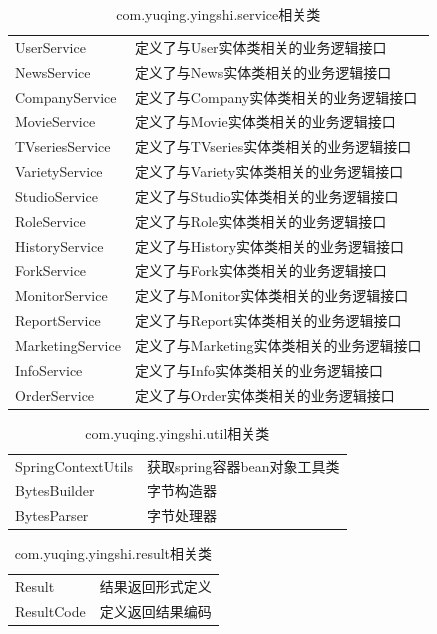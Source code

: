 \begin{table}
	\caption{com.yuqing.yingshi.service相关类}
	\centering
	\begin{tabular}{|p{3cm}|p{10cm}|} 
		\hline 
		\rowcolor[HTML]{DAE8FC} 
\multicolumn{2}{|c|}{com.yuqing.yingshi.service相关类} \\ 
\hline 
UserService&定义了与User实体类相关的业务逻辑接口\\
NewsService&定义了与News实体类相关的业务逻辑接口\\
CompanyService&定义了与Company实体类相关的业务逻辑接口\\
MovieService&定义了与Movie实体类相关的业务逻辑接口\\
TVseriesService&定义了与TVseries实体类相关的业务逻辑接口\\
VarietyService&定义了与Variety实体类相关的业务逻辑接口\\
StudioService&定义了与Studio实体类相关的业务逻辑接口\\
RoleService&定义了与Role实体类相关的业务逻辑接口\\
HistoryService&定义了与History实体类相关的业务逻辑接口\\
ForkService&定义了与Fork实体类相关的业务逻辑接口\\
MonitorService&定义了与Monitor实体类相关的业务逻辑接口\\
ReportService&定义了与Report实体类相关的业务逻辑接口\\
MarketingService&定义了与Marketing实体类相关的业务逻辑接口\\
InfoService&定义了与Info实体类相关的业务逻辑接口\\
OrderService&定义了与Order实体类相关的业务逻辑接口\\
\hline 
\end{tabular}
\end{table}
\begin{table}
	\caption{com.yuqing.yingshi.util相关类}
	\centering
	\begin{tabular}{|p{4.5cm}|p{8.5cm}|} 
		\hline 
		\rowcolor[HTML]{DAE8FC} 
		\multicolumn{2}{|c|}{com.yuqing.yingshi.util相关类} \\ 
		\hline 
		SpringContextUtils&获取spring容器bean对象工具类\\
		BytesBuilder&字节构造器\\
		BytesParser&字节处理器\\
		\hline 
	\end{tabular}
\end{table}
\begin{table}
	\caption{com.yuqing.yingshi.result相关类}
	\centering
	\begin{tabular}{|p{4.5cm}|p{8.5cm}|} 
		\hline 
		\rowcolor[HTML]{DAE8FC} 
		\multicolumn{2}{|c|}{com.yuqing.yingshi.result相关类} \\ 
		\hline 
		Result&结果返回形式定义\\
		ResultCode&定义返回结果编码\\
		\hline 
	\end{tabular}
\end{table}
